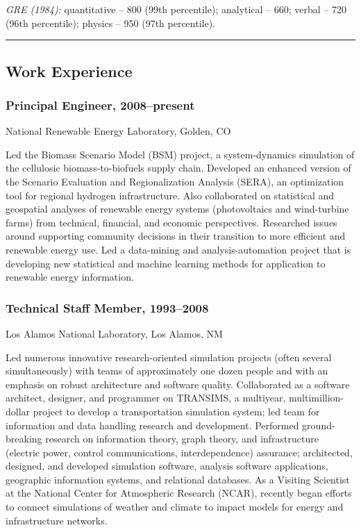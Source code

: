 \documentclass[]{article}
\begin{document}
\emph{GRE (1984):} quantitative -- 800 (99th percentile); analytical --
660; verbal -- 720 (96th percentile); physics -- 950 (97th percentile).

\begin{center}\rule{3in}{0.4pt}\end{center}

\subsection{Work Experience}\label{work-experience}

\subsubsection{Principal Engineer,
2008--present}\label{principal-engineer-2008present}

National Renewable Energy Laboratory, Golden, CO

Led the Biomass Scenario Model (BSM) project, a system-dynamics
simulation of the cellulosic biomass-to-biofuels supply chain. Developed
an enhanced version of the Scenario Evaluation and Regionalization
Analysis (SERA), an optimization tool for regional hydrogen
infrastructure. Also collaborated on statistical and geospatial analyses
of renewable energy systems (photovoltaics and wind-turbine farms) from
technical, financial, and economic perspectives. Researched issues
around supporting community decisions in their transition to more
efficient and renewable energy use. Led a data-mining and
analysis-automation project that is developing new statistical and
machine learning methods for application to renewable energy
information.

\subsubsection{Technical Staff Member,
1993--2008}\label{technical-staff-member-19932008}

Los Alamos National Laboratory, Los Alamos, NM

Led numerous innovative research-oriented simulation projects (often
several simultaneously) with teams of approximately one dozen people and
with an emphasis on robust architecture and software quality.
Collaborated as a software architect, designer, and programmer on
TRANSIMS, a multiyear, multimillion-dollar project to develop a
transportation simulation system; led team for information and data
handling research and development. Performed ground-breaking research on
information theory, graph theory, and infrastructure (electric power,
control communications, interdependence) assurance; architected,
designed, and developed simulation software, analysis software
applications, geographic information systems, and relational databases.
As a Visiting Scientist at the National Center for Atmospheric Research
(NCAR), recently began efforts to connect simulations of weather and
climate to impact models for energy and infrastructure networks.
\end{document}
